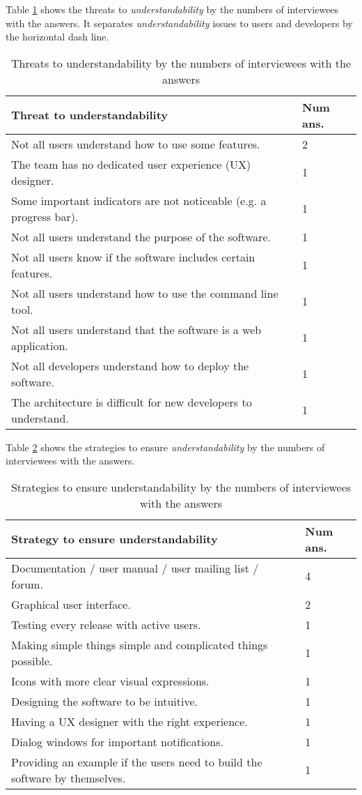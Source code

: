 Table \ref{tab_q17_threats_understandability} shows the threats to \textit{understandability} by the numbers of interviewees with the answers. It separates \textit{understandability} issues to users and developers by the horizontal dash line.

\begin{table}[H]
\centering
\begin{tabular}{ll}
\hline
Threat to understandability & Num ans. \\ \hline
Not all users understand how to use some features. & 2 \\
The team has no dedicated user experience (UX) designer. & 1 \\
Some important indicators are not noticeable (e.g. a progress bar). & 1 \\
Not all users understand the purpose of the software. & 1 \\
Not all users know if the software includes certain features. & 1 \\
Not all users understand how to use the command line tool. & 1 \\
Not all users understand that the software is a web application. & 1 \\\hdashline
Not all developers understand how to deploy the software. & 1 \\
The architecture is difficult for new developers to understand. & 1 \\ \hline
\end{tabular}
\caption{\label{tab_q17_threats_understandability}Threats to understandability by the numbers of interviewees with the answers}
\end{table}

Table \ref{tab_q17_strategies_understandability} shows the strategies to ensure \textit{understandability} by the numbers of interviewees with the answers.

\begin{table}[H]
\centering
\begin{tabular}{ll}
\hline
Strategy to ensure understandability & Num ans. \\ \hline
Documentation / user manual / user mailing list / forum. & 4 \\
Graphical user interface. & 2 \\
Testing every release with active users. & 1 \\
Making simple things simple and complicated things possible. & 1 \\
Icons with more clear visual expressions. & 1 \\
Designing the software to be intuitive. & 1 \\
Having a UX designer with the right experience. & 1 \\
Dialog windows for important notifications. & 1 \\
Providing an example if the users need to build the software by themselves. & 1 \\ \hline
\end{tabular}
\caption{\label{tab_q17_strategies_understandability}Strategies to ensure understandability by the numbers of interviewees with the answers}
\end{table}

